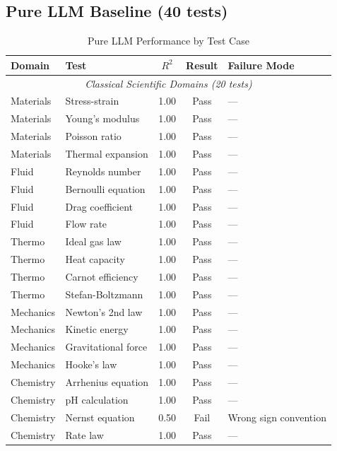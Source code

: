 \subsection{Pure LLM Baseline (40 tests)}

\begin{table}[H]
\centering
\caption{Pure LLM Performance by Test Case}
\label{tab:llm_detailed}
\begin{small}
\begin{tabular}{@{}llccp{4.5cm}@{}}
\toprule
\textbf{Domain} & \textbf{Test} & \textbf{$R^2$} & \textbf{Result} & \textbf{Failure Mode} \\
\midrule
\multicolumn{5}{c}{\textit{Classical Scientific Domains (20 tests)}} \\
\midrule
Materials & Stress-strain & 1.00 & Pass & --- \\
Materials & Young's modulus & 1.00 & Pass & --- \\
Materials & Poisson ratio & 1.00 & Pass & --- \\
Materials & Thermal expansion & 1.00 & Pass & --- \\
Fluid & Reynolds number & 1.00 & Pass & --- \\
Fluid & Bernoulli equation & 1.00 & Pass & --- \\
Fluid & Drag coefficient & 1.00 & Pass & --- \\
Fluid & Flow rate & 1.00 & Pass & --- \\
Thermo & Ideal gas law & 1.00 & Pass & --- \\
Thermo & Heat capacity & 1.00 & Pass & --- \\
Thermo & Carnot efficiency & 1.00 & Pass & --- \\
Thermo & Stefan-Boltzmann & 1.00 & Pass & --- \\
Mechanics & Newton's 2nd law & 1.00 & Pass & --- \\
Mechanics & Kinetic energy & 1.00 & Pass & --- \\
Mechanics & Gravitational force & 1.00 & Pass & --- \\
Mechanics & Hooke's law & 1.00 & Pass & --- \\
Chemistry & Arrhenius equation \citep{arrhenius1889reaction} & 1.00 & Pass & --- \\
Chemistry & pH calculation & 1.00 & Pass & --- \\
Chemistry & Nernst equation & 0.50 & Fail & Wrong sign convention \\
Chemistry & Rate law & 1.00 & Pass & --- \\

\end{tabular}
\end{small}
\end{table}
